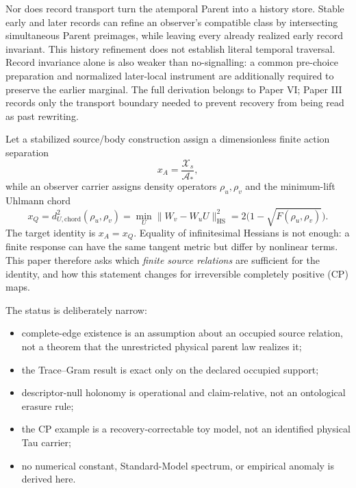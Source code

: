 \documentclass[11pt]{article}
\newcommand{\Astar}{\mathcal A_*}
\newcommand{\HS}{\mathrm{HS}}
\begin{document}
Nor does record transport turn the atemporal Parent into a history store.
Stable early and later records can refine an observer's compatible class by
intersecting simultaneous Parent preimages, while leaving every already
realized early record invariant.  This history refinement does not establish
literal temporal traversal.  Record invariance alone is also weaker than
no-signalling: a common pre-choice preparation and normalized later-local
instrument are additionally required to preserve the earlier marginal.  The
full derivation belongs to Paper VI; Paper III records only the transport
boundary needed to prevent recovery from being read as past rewriting.

Let a stabilized source/body construction assign a dimensionless finite
action separation
\begin{equation}
 x_A=\frac{\mathcal X_s}{\Astar},
 \label{eq:action-separation}
\end{equation}
while an observer carrier assigns density operators \(\rho_u,\rho_v\) and the
minimum-lift Uhlmann chord
\begin{equation}
 x_Q=d_{U,\mathrm{chord}}^2(\rho_u,\rho_v)
 =\min_U\lVert W_v-W_uU\rVert_{\HS}^2
 =2\bigl(1-\sqrt{F(\rho_u,\rho_v)}\bigr).
 \label{eq:quantum-separation}
\end{equation}
The target identity is \(x_A=x_Q\).  Equality of infinitesimal Hessians is not
enough: a finite response can have the same tangent metric but differ by
nonlinear terms.  This paper therefore asks which \emph{finite source
relations} are sufficient for the identity, and how this statement changes
for irreversible completely positive (CP) maps.

The status is deliberately narrow:
\begin{itemize}
 \item complete-edge existence is an assumption about an occupied source
 relation, not a theorem that the unrestricted physical parent law realizes
 it;
 \item the Trace--Gram result is exact only on the declared occupied support;
 \item descriptor-null holonomy is operational and claim-relative, not an
 ontological erasure rule;
 \item the CP example is a recovery-correctable toy model, not an identified
 physical Tau carrier;
 \item no numerical constant, Standard-Model spectrum, or empirical anomaly is
 derived here.
\end{itemize}
\end{document}
